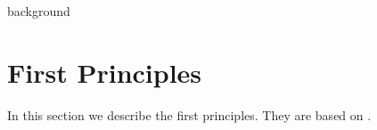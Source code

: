 background

\section{First Principles}
In this section we describe the first principles. They are based on \cite{ast_wit2011}.

